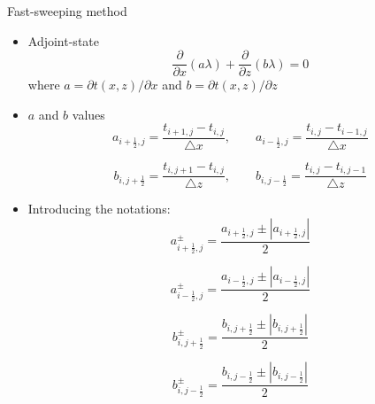 \documentclass{beamer}
\begin{document}
 \begin{frame}{Fast-sweeping method}
  \begin{itemize}
   \item Adjoint-state
   \begin{equation}
    \frac{\partial}{\partial x}(a\lambda) + \frac{\partial}{\partial z}(b\lambda) = 0
   \end{equation}
   where $a = \partial t(x,z)/\partial x$ and $b = \partial t(x,z)/\partial z$
   
   \item $a$ and $b$ values
   \begin{equation}
    a_{i + \frac{1}{2},j} = \frac{t_{i+1,j} - t_{i,j}}{\triangle x}, \qquad a_{i - \frac{1}{2},j} = \frac{t_{i,j} - t_{i-1,j}}{\triangle x}
   \end{equation}
   
   \begin{equation}
    b_{i,j+\frac{1}{2}} = \frac{t_{i,j+1} - t_{i,j}}{\triangle z}, \qquad b_{i,j - \frac{1}{2}} = \frac{t_{i,j} - t_{i,j-1}}{\triangle z}
   \end{equation}
  \end{itemize}
 \end{frame}

 \begin{frame}
  \begin{itemize}
   \item Introducing the notations:
   \begin{equation}
    a^\pm_{i + \frac{1}{2},j} = \frac{a_{i + \frac{1}{2},j} \pm |a_{i + \frac{1}{2},j}|}{2}
   \end{equation}

   \begin{equation}
    a^\pm_{i - \frac{1}{2},j} = \frac{a_{i - \frac{1}{2},j} \pm |a_{i - \frac{1}{2},j}|}{2}
   \end{equation}
 
   \begin{equation}
    b^\pm_{i,j+\frac{1}{2}} = \frac{b_{i,j+\frac{1}{2}} \pm |b_{i,j+\frac{1}{2}}|}{2}
   \end{equation}
   
   \begin{equation}
    b^\pm_{i,j-\frac{1}{2}} = \frac{b_{i,j-\frac{1}{2}} \pm |b_{i,j-\frac{1}{2}}|}{2}
   \end{equation}


   
   
  \end{itemize} 
 \end{frame}
\end{document}
